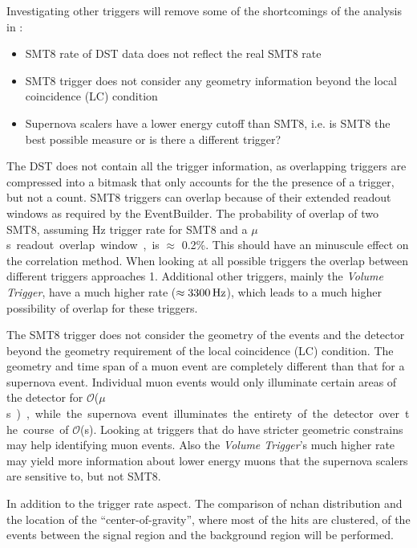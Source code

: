 Investigating other triggers will remove some of the shortcomings of the analysis in \cite{vbaumaster}:

\begin{itemize}
  \item SMT8 rate of DST data does not reflect the real SMT8 rate
  \item SMT8 trigger does not consider any geometry information beyond the local coincidence (LC) condition
  \item Supernova scalers have a lower energy cutoff than SMT8, i.e. is SMT8 the best possible measure or is there a different trigger?
\end{itemize}

The DST does not contain all the trigger information, as overlapping triggers are compressed into a bitmask that only accounts for the the presence of a trigger, but not a count. SMT8 triggers can overlap because of their extended readout windows as required by the EventBuilder. The probability of overlap of two SMT8, assuming \unit[2100]{Hz} trigger rate for SMT8 and a \unit[10]{$\mu$s} readout overlap window, is $\approx$ 0.2\%. This should have an minuscule effect on the correlation method. When looking at all possible triggers the overlap between different triggers approaches 1. Additional other triggers, mainly the \emph{Volume Trigger}, have a much higher rate ($\approx \unit[3300]{Hz}$), which leads to a much higher possibility of overlap for these triggers. 

The SMT8 trigger does not consider the geometry of the events and the detector beyond the geometry requirement of the local coincidence (LC) condition. The geometry and time span of a muon event are completely different than that for a supernova event. Individual muon events would only illuminate certain areas of the detector for $\mathcal{O}$(\unit[1 - 10]{$\mu$s}), while the supernova event illuminates the entirety of the detector over the course of $\mathcal{O}$(\unit[1 - 10]{s}). Looking at triggers that do have stricter geometric constrains may help identifying muon events. Also the \emph{Volume Trigger}'s much higher rate may yield more information about lower energy muons that the supernova scalers are sensitive to, but not SMT8. 

In addition to the trigger rate aspect. The comparison of nchan distribution and the location of the ``center-of-gravity'', where most of the hits are clustered, of the events between the signal region and the background region will be performed. 


